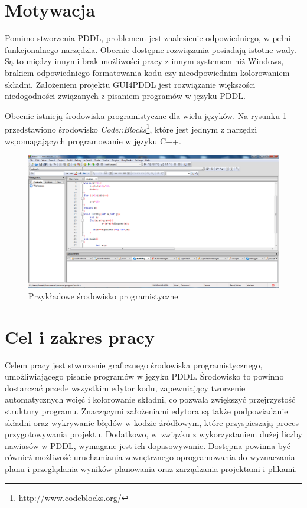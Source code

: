 \section{Motywacja}
Pomimo stworzenia PDDL, problemem jest znalezienie odpowiedniego, w pełni funkcjonalnego narzędzia. Obecnie dostępne rozwiązania posiadają istotne wady. Są to między innymi brak możliwości pracy z innym systemem  niż Windows, brakiem odpowiedniego formatowania kodu czy nieodpowiednim kolorowaniem składni. Założeniem projektu GUI4PDDL jest rozwiązanie większości niedogodności związanych z pisaniem programów w języku PDDL.

Obecnie istnieją środowiska programistyczne dla wielu języków. Na rysunku \ref{fig:srodowiskoprogramistyczne} przedstawiono środowisko \emph{Code::Blocks}\footnote{http://www.codeblocks.org/}, które jest 
jednym z narzędzi wspomagających programowanie w języku C++.

\begin{figure}[h!]
    \centering
    
    \includegraphics[width=\textwidth]{img/codeblocks}
    \caption{Przykładowe środowisko programistyczne}
    \label{fig:srodowiskoprogramistyczne}
\end{figure}

\section{Cel i zakres pracy}
Celem pracy jest stworzenie graficznego środowiska programistycznego, umożliwiającego pisanie programów w języku PDDL. Środowisko to powinno dostarczać przede wszystkim edytor kodu, zapewniający tworzenie automatycznych wcięć i kolorowanie składni, co pozwala zwiększyć przejrzystość struktury programu. Znaczącymi założeniami edytora są także podpowiadanie składni oraz wykrywanie błędów w kodzie źródłowym, które przyspieszają proces przygotowywania projektu. Dodatkowo, w~związku z wykorzystaniem dużej liczby nawiasów w PDDL, wymagane jest ich dopasowywanie. Dostępna powinna być również możliwość uruchamiania zewnętrznego oprogramowania do wyznaczania planu i przeglądania wyników planowania oraz zarządzania projektami i plikami.  

